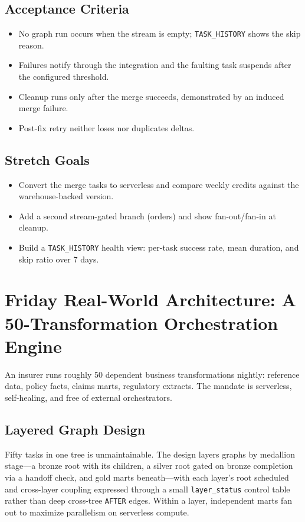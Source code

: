 \subsection*{Acceptance Criteria}
\begin{itemize}
    \item No graph run occurs when the stream is empty; \texttt{TASK\_HISTORY} shows the skip reason.
    \item Failures notify through the integration and the faulting task suspends after the configured threshold.
    \item Cleanup runs only after the merge succeeds, demonstrated by an induced merge failure.
    \item Post-fix retry neither loses nor duplicates deltas.
\end{itemize}

\subsection*{Stretch Goals}
\begin{itemize}
    \item Convert the merge tasks to serverless and compare weekly credits against the warehouse-backed version.
    \item Add a second stream-gated branch (orders) and show fan-out/fan-in at cleanup.
    \item Build a \texttt{TASK\_HISTORY} health view: per-task success rate, mean duration, and skip ratio over 7 days.
\end{itemize}

\section{Friday Real-World Architecture: A 50-Transformation Orchestration Engine}
An insurer runs roughly 50 dependent business transformations nightly: reference data, policy facts, claims marts, regulatory extracts. The mandate is serverless, self-healing, and free of external orchestrators.

\subsection{Layered Graph Design}
Fifty tasks in one tree is unmaintainable. The design layers graphs by medallion stage---a bronze root with its children, a silver root gated on bronze completion via a handoff check, and gold marts beneath---with each layer's root scheduled and cross-layer coupling expressed through a small \texttt{layer\_status} control table rather than deep cross-tree \texttt{AFTER} edges. Within a layer, independent marts fan out to maximize parallelism on serverless compute.

